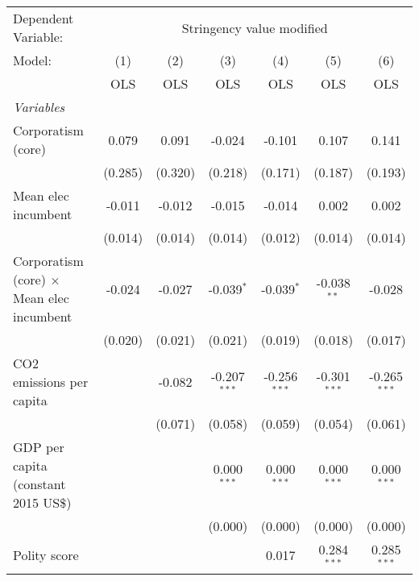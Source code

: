 
\begingroup
\centering
\begin{tabular}{lcccccc}
   \toprule
   Dependent Variable: & \multicolumn{6}{c}{Stringency value modified}\\
   Model:                                           & (1)     & (2)     & (3)            & (4)            & (5)            & (6)\\  
                                                    &  OLS    & OLS     & OLS            & OLS            & OLS            & OLS\\  
   \midrule
   \emph{Variables}\\
   Corporatism (core)                               & 0.079   & 0.091   & -0.024         & -0.101         & 0.107          & 0.141\\   
                                                    & (0.285) & (0.320) & (0.218)        & (0.171)        & (0.187)        & (0.193)\\   
   Mean elec incumbent                              & -0.011  & -0.012  & -0.015         & -0.014         & 0.002          & 0.002\\   
                                                    & (0.014) & (0.014) & (0.014)        & (0.012)        & (0.014)        & (0.014)\\   
   Corporatism (core) $\times$ Mean elec incumbent  & -0.024  & -0.027  & -0.039$^{*}$   & -0.039$^{*}$   & -0.038$^{**}$  & -0.028\\   
                                                    & (0.020) & (0.021) & (0.021)        & (0.019)        & (0.018)        & (0.017)\\   
   CO2 emissions per capita                         &         & -0.082  & -0.207$^{***}$ & -0.256$^{***}$ & -0.301$^{***}$ & -0.265$^{***}$\\   
                                                    &         & (0.071) & (0.058)        & (0.059)        & (0.054)        & (0.061)\\   
   GDP per capita (constant 2015 US\$)              &         &         & 0.000$^{***}$  & 0.000$^{***}$  & 0.000$^{***}$  & 0.000$^{***}$\\   
                                                    &         &         & (0.000)        & (0.000)        & (0.000)        & (0.000)\\   
   Polity score                                     &         &         &                & 0.017          & 0.284$^{***}$  & 0.285$^{***}$\\   

\end{tabular}
